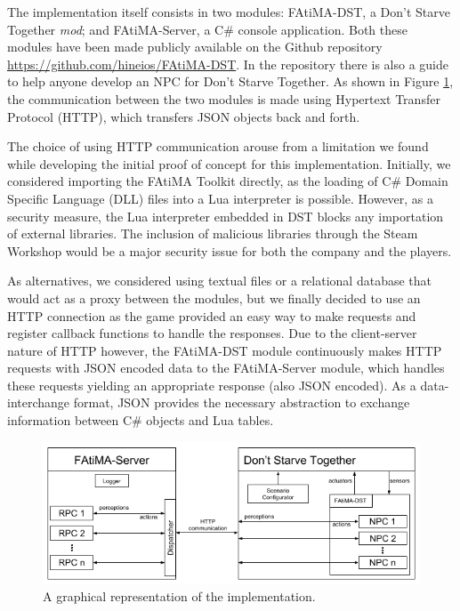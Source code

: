 The implementation itself consists in two modules: FAtiMA-DST, a Don't Starve Together \textit{mod}; and FAtiMA-Server, a C\# console application.
Both these modules have been made publicly available on the Github repository \href{https://github.com/hineios/FAtiMA-DST}{https://github.com/hineios/FAtiMA-DST}.
In the repository there is also a guide to help anyone develop an NPC for Don't Starve Together.
As shown in Figure \ref{fig:implementation}, the communication between the two modules is made using Hypertext Transfer Protocol (HTTP), which transfers JSON objects back and forth.

The choice of using HTTP communication arouse from a limitation we found while developing the initial proof of concept for this implementation.
Initially, we considered importing the FAtiMA Toolkit directly, as the loading of C\# Domain Specific Language (DLL) files into a Lua interpreter is possible.
However, as a security measure, the Lua interpreter embedded in DST blocks any importation of external libraries.
The inclusion of malicious libraries through the Steam Workshop would be a major security issue for both the company and the players.

As alternatives, we considered using textual files or a relational database that would act as a proxy between the modules, but we finally decided to use an HTTP connection as the game provided an easy way to make requests and register callback functions to handle the responses.
Due to the client-server nature of HTTP however, the FAtiMA-DST module continuously makes HTTP requests with JSON encoded data to the FAtiMA-Server module, which handles these requests yielding an appropriate response (also JSON encoded).
As a data-interchange format, JSON provides the necessary abstraction to exchange information between C\# objects and Lua tables.

\begin{figure}
  \centering
    \includegraphics[width=.8\textwidth]{./Images/implementation}
  \caption{A graphical representation of the implementation.}
  \label{fig:implementation}
\end{figure}

